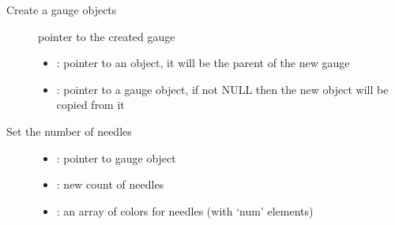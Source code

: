 \documentclass[letterpaper,10pt,english]{sphinxmanual}
\begin{document}
\begin{fulllineitems}
\label{\detokenize{object-types/gauge:_CPPv415lv_gauge_createP8lv_obj_tPK8lv_obj_t}}%
\pysigstartmultiline
{}\label{\detokenize{object-types/gauge:lv__gauge_8h_1aca5fb7074625619fce863048f2540fc6}}%
\pysigstopmultiline
Create a gauge objects \begin{description}
\item[{}] \leavevmode
pointer to the created gauge 

\item[{}] \leavevmode\begin{itemize}
\item {} 
: pointer to an object, it will be the parent of the new gauge 

\item {} 
: pointer to a gauge object, if not NULL then the new object will be copied from it 

\end{itemize}

\end{description}


\end{fulllineitems}


\begin{fulllineitems}
\label{\detokenize{object-types/gauge:_CPPv425lv_gauge_set_needle_countP8lv_obj_t7uint8_tA_K10lv_color_t}}%
\pysigstartmultiline
{}\label{\detokenize{object-types/gauge:lv__gauge_8h_1a5cb0de42a1b5c2dd06a586f1c583fc60}}%
\pysigstopmultiline
Set the number of needles \begin{description}
\item[{}] \leavevmode\begin{itemize}
\item {} 
: pointer to gauge object 

\item {} 
: new count of needles 

\item {} 
: an array of colors for needles (with ‘num’ elements) 

\end{itemize}

\end{description}


\end{fulllineitems}
\end{document}
